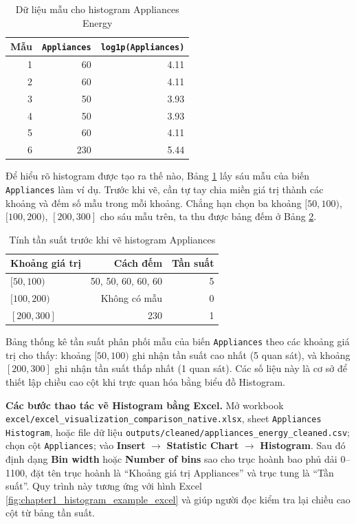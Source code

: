 \begin{table}[H]
\centering
\caption{Dữ liệu mẫu cho histogram Appliances Energy}
\label{tab:chapter1_histogram_sample_data}
\small
\begin{tabular}{rrr}
\toprule
Mẫu & \texttt{Appliances} & \texttt{log1p(Appliances)} \\
\midrule
1 & 60 & 4.11 \\
2 & 60 & 4.11 \\
3 & 50 & 3.93 \\
4 & 50 & 3.93 \\
5 & 60 & 4.11 \\
6 & 230 & 5.44 \\
\bottomrule
\end{tabular}
\end{table}

Để hiểu rõ histogram được tạo ra thế nào, Bảng \ref{tab:chapter1_histogram_sample_data} lấy sáu mẫu của biến \texttt{Appliances} làm ví dụ. Trước khi vẽ, cần tự tay chia miền giá trị thành các khoảng và đếm số mẫu trong mỗi khoảng. Chẳng hạn chọn ba khoảng $[50,100)$, $[100,200)$, $[200,300]$ cho sáu mẫu trên, ta thu được bảng đếm ở Bảng \ref{tab:chapter1_histogram_calc}.

\begin{table}[H]
\centering
\caption{Tính tần suất trước khi vẽ histogram Appliances}
\label{tab:chapter1_histogram_calc}
\small
\begin{tabular}{lrr}
\toprule
Khoảng giá trị & Cách đếm & Tần suất \\
\midrule
$[50,100)$ & 50, 50, 60, 60, 60 & 5 \\
$[100,200)$ & Không có mẫu & 0 \\
$[200,300]$ & 230 & 1 \\
\bottomrule
\end{tabular}
\end{table}

Bảng thống kê tần suất phân phối mẫu của biến \texttt{Appliances} theo các khoảng giá trị cho thấy: khoảng $[50,100)$ ghi nhận tần suất cao nhất (5 quan sát), và khoảng $[200,300]$ ghi nhận tần suất thấp nhất (1 quan sát). Các số liệu này là cơ sở để thiết lập chiều cao cột khi trực quan hóa bằng biểu đồ Histogram.

\textbf{Các bước thao tác vẽ Histogram bằng Excel.} Mở workbook \texttt{excel/excel\_visualization\_comparison\_native.xlsx}, sheet \texttt{Appliances Histogram}, hoặc file dữ liệu \texttt{outputs/cleaned/appliances\_energy\_cleaned.csv}; chọn cột \texttt{Appliances}; vào \textbf{Insert} $\rightarrow$ \textbf{Statistic Chart} $\rightarrow$ \textbf{Histogram}. Sau đó định dạng \textbf{Bin width} hoặc \textbf{Number of bins} sao cho trục hoành bao phủ dải 0--1100, đặt tên trục hoành là ``Khoảng giá trị Appliances'' và trục tung là ``Tần suất''. Quy trình này tương ứng với hình Excel \ref{fig:chapter1_histogram_example_excel} và giúp người đọc kiểm tra lại chiều cao cột từ bảng tần suất.

